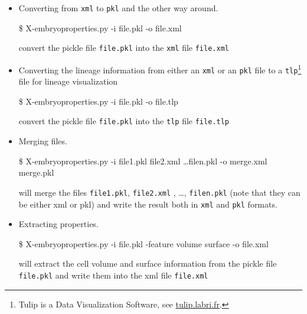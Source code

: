 \begin{itemize}
  \itemsep -0.5ex
\item Converting from \texttt{xml} to \texttt{pkl} and  the other way around.
  \begin{code}{0.8}
  \$ X-embryoproperties.py -i file.pkl -o file.xml
  \end{code}
  convert the pickle file \texttt{file.pkl} into the \texttt{xml} file  \texttt{file.xml}
\item Converting the lineage information from either an \texttt{xml}
  or an \texttt{pkl} file to a \texttt{tlp}\footnote{Tulip is a Data
    Visualization Software, see \url{tulip.labri.fr}.} file for lineage visualization
  \begin{code}{0.8}
  \$ X-embryoproperties.py -i file.pkl -o file.tlp
  \end{code}
  convert the pickle file \texttt{file.pkl} into the \texttt{tlp} file  \texttt{file.tlp}
\item Merging files.
  \begin{code}{0.8}
  \$ X-embryoproperties.py -i file1.pkl file2.xml \ldots filen.pkl -o merge.xml merge.pkl
  \end{code}
  will merge the files  \texttt{file1.pkl},  \texttt{file2.xml} , \ldots, \texttt{filen.pkl} (note that they can be either xml or pkl) and write the result both in \texttt{xml} and \texttt{pkl} formats.
\item Extracting properties.
  \begin{code}{0.8}
  \$ X-embryoproperties.py -i file.pkl -feature volume surface -o file.xml
  \end{code}
  will extract the cell volume and surface information from the  pickle file \texttt{file.pkl} and write them into the xml file  \texttt{file.xml}
\end{itemize}
